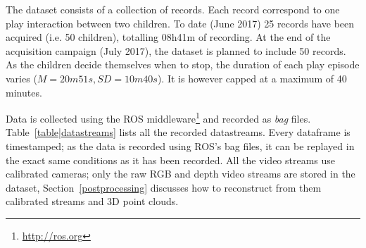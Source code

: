 \documentclass{article}
\newcommand{\ie}{i.e.\xspace}
\begin{document}
The dataset consists of a collection of records. Each record correspond to one
play interaction between two children. To date (June 2017) 25 records have been
acquired (\ie 50 children), totalling 08h41m of recording. At the end of the acquisition campaign
(July 2017), the dataset is planned to include 50 records. As
the children decide themselves when to stop, the duration of each play episode varies ($M=20m51s,
SD=10m40s$). It is however capped at a maximum of 40 minutes.

Data is collected using the ROS middleware\footnote{\url{http://ros.org}} and
recorded as \emph{bag} files. Table~\ref{table|datastreams} lists all the
recorded datastreams.  Every dataframe is timestamped; as the data is recorded
using ROS's bag files, it can be replayed in the exact same conditions as it
has been recorded.  All the video streams use calibrated cameras; only the raw
RGB and depth video streams are stored in the dataset, Section~\ref{postprocessing} discusses
how to reconstruct from them calibrated streams and 3D point clouds.
\end{document}
